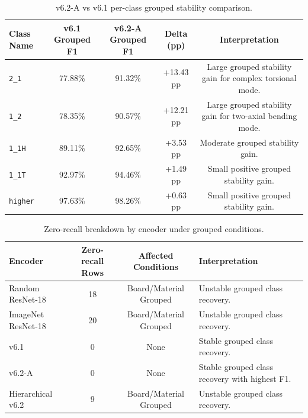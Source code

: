 \documentclass[review,3p,times]{elsarticle}
\begin{document}
\begin{table}[htbp]
\centering
\caption{v6.2-A vs v6.1 per-class grouped stability comparison.}
\label{tab:table5}
\begin{tabular}{lcccc}
\toprule
\textbf{Class Name} & \textbf{v6.1 Grouped F1} & \textbf{v6.2-A Grouped F1} & \textbf{Delta (pp)} & \textbf{Interpretation} \\
\midrule
\texttt{2\_1} & 77.88\% & 91.32\% & +13.43 pp & Large grouped stability gain for complex torsional mode. \\
\texttt{1\_2} & 78.35\% & 90.57\% & +12.21 pp & Large grouped stability gain for two-axial bending mode. \\
\texttt{1\_1H} & 89.11\% & 92.65\% & +3.53 pp & Moderate grouped stability gain. \\
\texttt{1\_1T} & 92.97\% & 94.46\% & +1.49 pp & Small positive grouped stability gain. \\
\texttt{higher} & 97.63\% & 98.26\% & +0.63 pp & Small positive grouped stability gain. \\
\bottomrule
\end{tabular}
\end{table}

\begin{table}[htbp]
\centering
\caption{Zero-recall breakdown by encoder under grouped conditions.}
\label{tab:table6}
\begin{tabular}{lccl}
\toprule
\textbf{Encoder} & \textbf{Zero-recall Rows} & \textbf{Affected Conditions} & \textbf{Interpretation} \\
\midrule
Random ResNet-18 & 18 & Board/Material Grouped & Unstable grouped class recovery. \\
ImageNet ResNet-18 & 20 & Board/Material Grouped & Unstable grouped class recovery. \\
v6.1 & 0 & None & Stable grouped class recovery. \\
v6.2-A & 0 & None & Stable grouped class recovery with highest F1. \\
Hierarchical v6.2 & 9 & Board/Material Grouped & Unstable grouped class recovery. \\
\bottomrule
\end{tabular}
\end{table}
\end{document}
